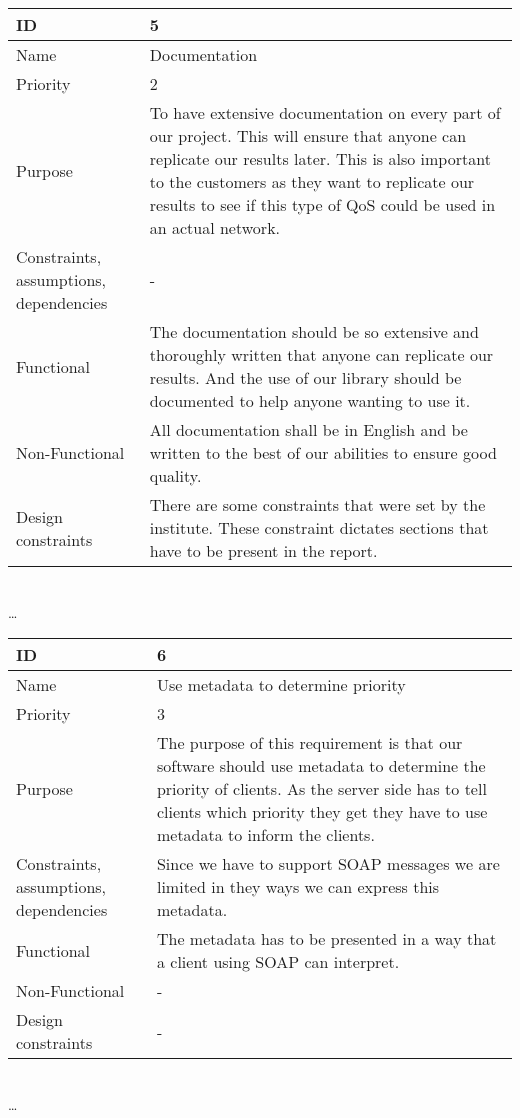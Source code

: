 \begin{center}
	\begin{tabular}{| p{4cm} | p{8cm} |}
		\hline
		ID & 5 \\
		\hline
		Name & Documentation  \\
		\hline
		Priority & 2 \\
		\hline
		Purpose & To have extensive documentation on every part of our project. This will ensure that anyone can replicate our results later. This is also important to the customers as they want to replicate our results to see if this type of QoS could be used in an actual network.\\
		\hline 
		Constraints, assumptions, dependencies & -\\
		\hline  
		Functional & The documentation should be so extensive and thoroughly written that anyone can replicate our results. And the use of our library should be documented to help anyone wanting to use it. \\
		\hline
		Non-Functional & All documentation shall be in English and be written to the best of our abilities to ensure good quality. \\ 
		\hline
		Design constraints & There are some constraints that were set by the institute. These constraint dictates sections that have to be present in the report. \\
		\hline
	\end{tabular}
	\\  \ldots  \\

	\begin{tabular}{| p{4cm} | p{8cm} |}
		\hline
		ID & 6 \\
		\hline
		Name & Use metadata to determine priority  \\
		\hline
		Priority & 3 \\
		\hline
		Purpose & The purpose of this requirement is that our software should use metadata to determine the priority of clients. As the server side has to tell clients which priority they get they have to use metadata to inform the clients. \\
		\hline 
		Constraints, assumptions, dependencies & Since we have to support SOAP messages we are limited in they ways we can express this metadata. \\
		\hline  
		Functional & The metadata has to be presented in a way that a client using SOAP can interpret. \\
		\hline
		Non-Functional & -\\ 
		\hline
		Design constraints & -\\
		\hline
	\end{tabular}
	\\  \ldots  \\


\end{center}
